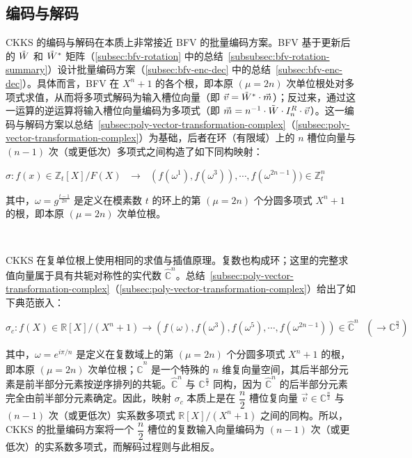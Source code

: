 \clearpage


\subsection{编码与解码}
\label{subsec:ckks-encoding-decoding}


CKKS 的编码与解码在本质上非常接近 BFV 的批量编码方案。BFV 基于更新后的 $\tilde W$ 和 $\tilde W^*$ 矩阵（\autoref{subsec:bfv-rotation} 中的总结~\ref*{subsubsec:bfv-rotation-summary}）设计批量编码方案（\autoref{subsec:bfv-enc-dec} 中的总结~\ref*{subsec:bfv-enc-dec}）。具体而言，BFV 在 $X^n+1$ 的各个根，即本原 $(\mu=2n)$ 次单位根处对多项式求值，从而将多项式解码为输入槽位向量（即 $\vec{v} = \tilde W^* \cdot \vec{m}$）；反过来，通过这一运算的逆运算将输入槽位向量编码为多项式（即 $\vec{m} = n^{-1} \cdot \tilde W \cdot I_n^R \cdot \vec{v}$）。这一编码与解码方案以总结~\ref*{subsec:poly-vector-transformation-complex}（\autoref{subsec:poly-vector-transformation-complex}）为基础，后者在环（有限域）上的 $n$ 槽位向量与 $(n-1)$ 次（或更低次）多项式之间构造了如下同构映射：

$\sigma: f(x) \in \mathbb{Z}_t[X] / F(X) \text{ } \longrightarrow \text{ } (f(\omega^1), f(\omega^3)), \cdots, f(\omega^{2n-1})) \in \mathbb{Z}_t^n$

其中，$\omega = g^{\frac{t - 1}{2n}}$ 是定义在模素数 $t$ 的环上的第 $(\mu=2n)$ 个分圆多项式 $X^n + 1$ 的根，即本原 $(\mu=2n)$ 次单位根。

$ $

CKKS 在复单位根上使用相同的求值与插值原理。复数也构成环；这里的完整求值向量属于具有共轭对称性的实代数 $\mathbb{\hat C}^n$。总结~\ref*{subsec:poly-vector-transformation-complex}（\autoref{subsec:poly-vector-transformation-complex}）给出了如下典范嵌入：

$\sigma_c: f(X) \in \mathbb{R}[X]/(X^n + 1) \longrightarrow (f(\omega),f(\omega^3),f(\omega^5), \cdots, f(\omega^{2n-1})) \in \mathbb{\hat{C}}^{n} \text{ } (\longrightarrow \mathbb{C}^{\frac{n}{2}})$


其中，$\omega = e^{i\pi/n}$ 是定义在复数域上的第 $(\mu=2n)$ 个分圆多项式 $X^n + 1$ 的根，即本原 $(\mu=2n)$ 次单位根；$\mathbb{\hat{C}}^{n}$ 是一个特殊的 $n$ 维复向量空间，其后半部分元素是前半部分元素按逆序排列的共轭。$\mathbb{\hat{C}}^{n}$ 与 $\mathbb{{C}}^{\frac{n}{2}}$ 同构，因为 $\mathbb{\hat{C}}^{n}$ 的后半部分元素完全由前半部分元素确定。因此，映射 $\sigma_c$ 本质上是在 $\dfrac{n}{2}$ 槽位复向量 $\vec{v} \in \mathbb{C}^{\frac{n}{2}}$ 与 $(n-1)$ 次（或更低次）实系数多项式 $\mathbb{R}[X] / (X^n + 1)$ 之间的同构。所以，CKKS 的批量编码方案将一个 $\dfrac{n}{2}$ 槽位的复数输入向量编码为 $(n-1)$ 次（或更低次）的实系数多项式，而解码过程则与此相反。

